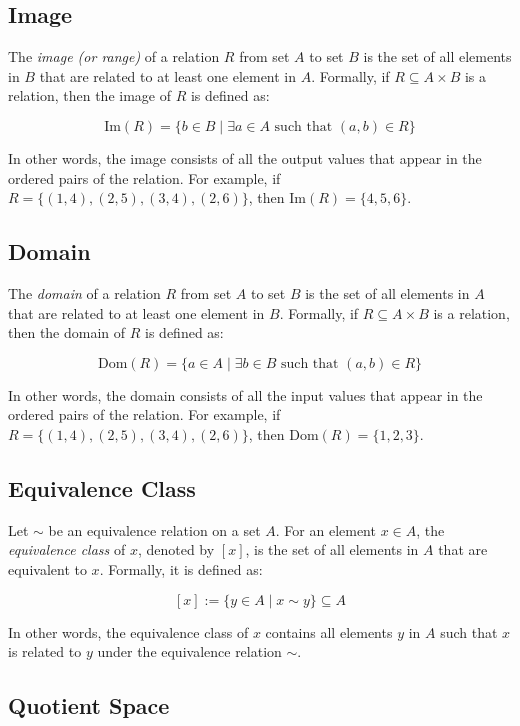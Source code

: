 \subsection{Image}

The \emph{image (or range)} of a relation \(R\) from set \(A\) to set \(B\) is the set of all elements 
in \(B\) that are related to at least one element in \(A\). Formally, if \(R \subseteq A \times B\) is a 
relation, then the image of \(R\) is defined as:

\[
	\text{Im}(R) = \{b \in B \mid \exists a \in A \text{ such that } (a,b) \in R\}
\]

In other words, the image consists of all the output values that appear in the ordered pairs of the 
relation. For example, if \(R = \{(1,4), (2,5), (3,4), (2,6)\}\), then \(\text{Im}(R) = \{4, 5, 6\}\).

\subsection{Domain}

The \emph{domain} of a relation \(R\) from set \(A\) to set \(B\) is the set of all elements in \(A\) that 
are related to at least one element in \(B\). Formally, if \(R \subseteq A \times B\) is a relation, 
then the domain of \(R\) is defined as:

\[
	\text{Dom}(R) = \{a \in A \mid \exists b \in B \text{ such that } (a,b) \in R\}
\]

In other words, the domain consists of all the input values that appear in the ordered pairs of the 
relation. For example, if \(R = \{(1,4), (2,5), (3,4), (2,6)\}\), then \(\text{Dom}(R) = \{1, 2, 3\}\).

\subsection{Equivalence Class}

Let \(\sim\) be an equivalence relation on a set \(A\). For an element \(x \in A\), the 
\emph{equivalence class} of \(x\), denoted by \([x]\), is the set of all elements in \(A\) that are 
equivalent to \(x\). Formally, it is defined as:

\[
	[x] := \{y \in A \mid x \sim y\} \subseteq A
\]

In other words, the equivalence class of \(x\) contains all elements \(y\) in \(A\) such that \(x\) is 
related to \(y\) under the equivalence relation \(\sim\).

\subsection{Quotient Space}

